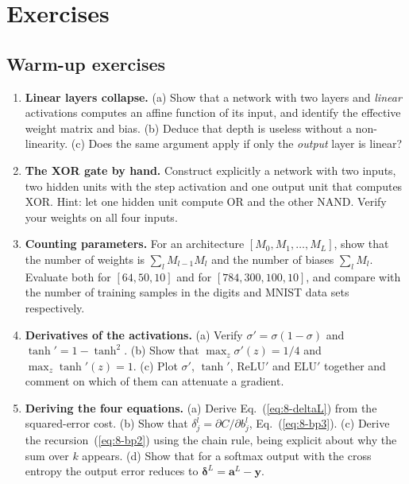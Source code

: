 \section{Exercises}
\label{sec:ch8exercises}

\subsection*{Warm-up exercises}

\begin{enumerate}

\item \textbf{Linear layers collapse.}
  (a) Show that a network with two layers and \emph{linear} activations
      computes an affine function of its input, and identify the effective
      weight matrix and bias.
  (b) Deduce that depth is useless without a non-linearity.
  (c) Does the same argument apply if only the \emph{output} layer is linear?

\item \textbf{The XOR gate by hand.}
  Construct explicitly a network with two inputs, two hidden units with the
  step activation and one output unit that computes XOR.  Hint: let one hidden
  unit compute OR and the other NAND.  Verify your weights on all four inputs.

\item \textbf{Counting parameters.}
  For an architecture $[M_0,M_1,\dots,M_L]$, show that the number of weights is
  $\sum_l M_{l-1}M_l$ and the number of biases $\sum_l M_l$.  Evaluate both for
  $[64,50,10]$ and for $[784,300,100,10]$, and compare with the number of
  training samples in the digits and MNIST data sets respectively.

\item \textbf{Derivatives of the activations.}
  (a) Verify $\sigma'=\sigma(1-\sigma)$ and $\tanh'=1-\tanh^{2}$.
  (b) Show that $\max_z\sigma'(z)=1/4$ and $\max_z\tanh'(z)=1$.
  (c) Plot $\sigma'$, $\tanh'$, $\mathrm{ReLU}'$ and $\mathrm{ELU}'$ together
      and comment on which of them can attenuate a gradient.

\item \textbf{Deriving the four equations.}
  (a) Derive Eq.~(\ref{eq:8-deltaL}) from the squared-error cost.
  (b) Show that $\delta_j^{l}=\partial C/\partial b_j^{l}$,
      Eq.~(\ref{eq:8-bp3}).
  (c) Derive the recursion~(\ref{eq:8-bp2}) using the chain rule, being explicit
      about why the sum over $k$ appears.
  (d) Show that for a softmax output with the cross entropy the output error
      reduces to $\bm{\delta}^{L}=\bm{a}^{L}-\bm{y}$.


\end{enumerate}
